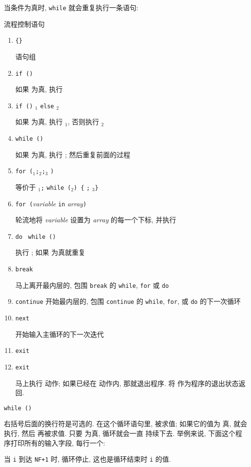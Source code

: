 当条件为真时, \verb'while' 就会重复执行一条语句:
\begin{summary}{流程控制语句}
    \begin{enumerate}
        \item \verb'{'\stmt\verb'}' \par
            语句组
        \item \verb'if ('\expr\verb')'\stmt \par
            如果 \expr 为真, 执行 \stmt
        \item \verb'if ('\expr\verb')' \stmt$_1$ \verb'else' \stmt$_2$ \par
            如果 \expr 为真, 执行 \stmt$_1$, 否则执行 \stmt$_2$
        \item \verb'while ('\expr\verb')' \stmt \par
            如果 \expr 为真, 执行 \stmt; 然后重复前面的过程
        \item \verb'for ('\expr$_1$\verb';'\expr$_2$\verb';'\expr$_3$
            \verb')' \stmt \par
            等价于 \expr$_1$\verb';' \verb'while ('\expr$_2$\verb') {'
            \stmt\verb';' \expr$_3$\verb'}'
        \item \verb'for ('\textit{variable} \verb'in'
            \textit{array}\verb')' \stmt \par
            轮流地将 \textit{variable} 设置为 \textit{array} 的每一个下标,
            并执行 \stmt
        \item \verb'do' \stmt\ \verb'while ('\expr\verb')' \par
            执行 \stmt; 如果 \expr 为真就重复
        \item \verb'break' \par
            马上离开最内层的, 包围 \verb'break' 的 \verb'while',
            \verb'for' 或 \verb'do'
        \item \verb'continue'
            开始最内层的, 包围 \verb'continue' 的 \verb'while', \verb'for',
            或 \verb'do' 的下一次循环
        \item \verb'next' \par
            开始输入主循环的下一次迭代
        \item \verb'exit'
        \item \verb'exit' \expr \par
            马上执行 \END 动作; 如果已经在 \END 动作内, 那就退出程序.
            将 \expr 作为程序的退出状态返回.
    \end{enumerate}
\end{summary}
\begin{pattern}
    \verb'while ('\expr\verb')' \par
    \indent\indent\stmt
\end{pattern}
右括号后面的换行符是可选的. 在这个循环语句里, \expr 被求值; 如果它的值为
真, \stmt 就会执行, 然后 \expr 再被求值. 只要 \expr 为真, 循环就会一直
持续下去. 举例来说, 下面这个程序打印所有的输入字段, 每行一个:
当 \verb'i' 到达 \verb'NF+1' 时, 循环停止, 这也是循环结束时 \verb'i' 的值.

